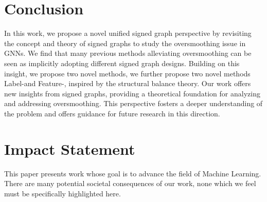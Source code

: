 
\section{Conclusion}
In this work, we propose a novel unified signed graph perspective by revisiting the concept and theory of signed graphs to study the oversmoothing issue in GNNs.
We find that many previous methods alleviating oversmoothing can be seen as implicitly adopting different signed graph designs. Building on this insight, we propose two novel methods, we further propose two novel methods Label-\ours and Feature-\ours, 
inspired by the structural balance theory.
Our work offers new insights from signed graphs, providing a theoretical foundation for analyzing and addressing oversmoothing. This perspective fosters a deeper understanding of the problem and offers guidance for future research in this direction.
\section{Impact Statement}
This paper presents work whose goal is to advance the field
of Machine Learning. There are many potential societal
consequences of our work, none which we feel must be
specifically highlighted here.
